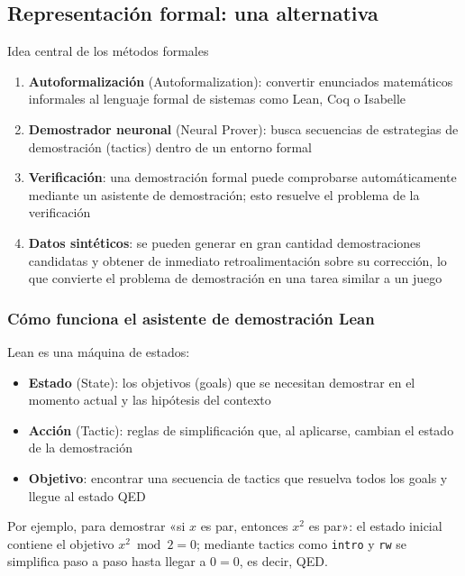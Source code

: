 \documentclass[a4paper]{article}
\begin{document}
\subsection{Representación formal: una alternativa}

\begin{importantbox}{Idea central de los métodos formales}
\begin{enumerate}
    \item \textbf{Autoformalización} (Autoformalization): convertir enunciados matemáticos informales al lenguaje formal de sistemas como Lean, Coq o Isabelle
    \item \textbf{Demostrador neuronal} (Neural Prover): busca secuencias de estrategias de demostración (tactics) dentro de un entorno formal
    \item \textbf{Verificación}: una demostración formal puede comprobarse automáticamente mediante un asistente de demostración; esto resuelve el problema de la verificación
    \item \textbf{Datos sintéticos}: se pueden generar en gran cantidad demostraciones candidatas y obtener de inmediato retroalimentación sobre su corrección, lo que convierte el problema de demostración en una tarea similar a un juego
\end{enumerate}
\end{importantbox}

\subsubsection{Cómo funciona el asistente de demostración Lean}

Lean es una máquina de estados:
\begin{itemize}
    \item \textbf{Estado} (State): los objetivos (goals) que se necesitan demostrar en el momento actual y las hipótesis del contexto
    \item \textbf{Acción} (Tactic): reglas de simplificación que, al aplicarse, cambian el estado de la demostración
    \item \textbf{Objetivo}: encontrar una secuencia de tactics que resuelva todos los goals y llegue al estado QED
\end{itemize}

Por ejemplo, para demostrar «si $x$ es par, entonces $x^2$ es par»: el estado inicial contiene el objetivo $x^2 \bmod 2 = 0$; mediante tactics como \texttt{intro} y \texttt{rw} se simplifica paso a paso hasta llegar a $0 = 0$, es decir, QED.
\end{document}
